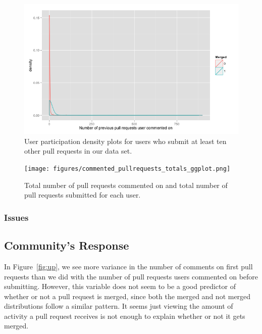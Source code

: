 \documentclass{sigchi}
\begin{document}
\begin{figure}[p] \centering
\includegraphics[scale=0.6]{figures/number_comments_density_repeaters_10_ggplot.png}
\caption{User participation density plots for users who submit at least ten
other pull requests in our data set.}
\label{fig:repeaters_10} \end{figure}

\begin{figure}[p] \centering
\texttt{[image: figures/commented\_pullrequests\_totals\_ggplot.png]}
\caption{Total number of pull requests commented on and total number of pull
requests submitted for each user.} \label{fig:commented_pullrequests_totals}
\end{figure}

\subsubsection{Issues}

\subsection{Community's Response}
In Figure~\ref{fig:up}, we see more variance in the number of comments on
first pull requests than we did with the number of pull requests users commented
on before submitting. However, this variable does not seem to be a good
predictor of whether or not a pull request is merged, since both the merged and
not merged distributions follow a similar pattern. It seems just viewing the
amount of activity a pull request receives is not enough to explain whether or
not it gets merged.
\end{document}
